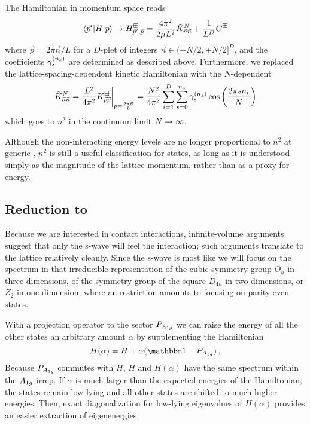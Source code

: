The Hamiltonian in momentum space reads
\begin{equation}
    \label{eq:p space hamiltonian}
    \left\langle \vec{p}' \middle| H \middle| \vec{p} \right\rangle
    \rightarrow
    H_{\vec{p}',\vec{p}}^\boxplus
    =
    \frac{4 \pi^2}{2\mu L^2} \tilde K_{\vec n \vec n}^{N}
    +\frac{1}{L^D}C^\boxplus
\end{equation}
where $\vec{p} = 2\pi \vec{n}/L$ for a $D$-plet of integers $\vec{n} \in (-N/2, +N/2]^D$, and the coefficients $\gamma_{s}^{({n_s})}$ are determined as described above.
Furthermore, we replaced the lattice-spacing-dependent kinetic Hamiltonian with the $N$-dependent
\begin{equation}\label{eq:normalized-kinetic-hamitlonian}
	\tilde K_{\vec n \vec n}^{N}
	= \frac{L^2}{4\pi^2} K_{\vec p \vec p}^{\boxplus} \bigg|_{p=\frac{2\pi \vec n}{L}}
	= \frac{N^2}{4\pi^2}
    \sum_{i=1}^{D}\sum_{s=0}^{{n_s}} \gamma_s^{({n_s})} \cos\left(\frac{2 \pi s n_i}{N}\right)
\end{equation}
which goes to $n^2$ in the continuum limit $N\rightarrow\infty$.

Although the non-interacting energy levels are no longer proportional to $n^2$ at generic \nstep, $n^2$ is still a useful classification for states, as long as it is understood simply as the magnitude of the lattice momentum, rather than as a proxy for energy.

\subsection{Reduction to  \texorpdfstring{\Aoneg}{A-one-g}}

Because we are interested in contact interactions, infinite-volume arguments suggest that only the s-wave will feel the interaction; such arguments translate to the lattice relatively cleanly.
Since the s-wave is most like \Aoneg we will focus on the spectrum in that irreducible representation of the cubic symmetry group $O_h$ in three dimensions, of the symmetry group of the square $D_{4h}$ in two dimensions, or $Z_2$ in one dimension, where an \Aoneg restriction amounts to focusing on parity-even states.

With a projection operator to the \Aoneg sector $P_{A_{1g}}$ we can raise the energy of all the other states an arbitrary amount $\alpha$ by supplementing the Hamiltonian
\begin{equation}
    H(\alpha) = H + \alpha (\one - P_{\Aoneg}) \, ,
\end{equation}
Because $P_{A_{1g}}$ commutes with $H$, $H$ and $H(\alpha)$ have the same spectrum within the $A_{1g}$ irrep.
If $\alpha$ is much larger than the expected energies of the Hamiltonian, the \Aoneg states remain low-lying and all other states are shifted to much higher energies.
Then, exact diagonalization for low-lying eigenvalues of $H(\alpha)$ provides an easier extraction of \Aoneg eigenenergies.

